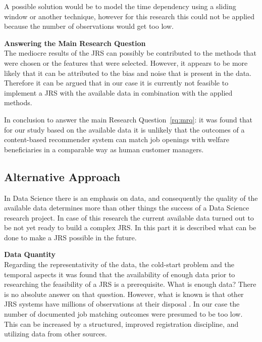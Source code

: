 A possible solution would be to model the time dependency using a sliding window or another technique, however for this research this could not be applied because the number of observations would get too low.

\noindent
\textbf{Answering the Main Research Question}\\
The mediocre results of the JRS can possibly be contributed to the methods that were chosen or the features that were selected. 
However, it appears to be more likely that it can be attributed to the bias and noise that is present in the data.
Therefore it can be argued that in our case it is currently not feasible to implement a JRS with the available data in combination with the applied methods. 

In conclusion to answer the main Research Question~\ref{rq:mrq}: it was found that for our study based on the available data it is unlikely that the outcomes of a content-based recommender system can match job openings with welfare beneficiaries in a comparable way as human customer managers. 

\subsection{Alternative Approach}
\label{ssec:learnings}

In Data Science there is an emphasis on data, and consequently the quality of the available data determines more than other things the success of a Data Science research project.
In case of this research the current available data turned out to be not yet ready to build a complex JRS. 
In this part it is described what can be done to make a JRS possible in the future.

\noindent
\textbf{Data Quantity}\\
Regarding the representativity of the data, the cold-start problem and the temporal aspects it was found that the availability of enough data prior to researching the feasibility of a JRS is a prerequisite.
What is enough data?
There is no absolute answer on that question. 
However, what is known is that other JRS systems have millions of observations at their disposal \cite{kenthapadi2017personalized, T.Al-Otaibi2012ASystems, Zheng2012JobSurvey, hong2013job}.
In our case the number of documented job matching outcomes were presumed to be too low. 
This can be increased by a structured, improved registration discipline, and utilizing data from other sources.


